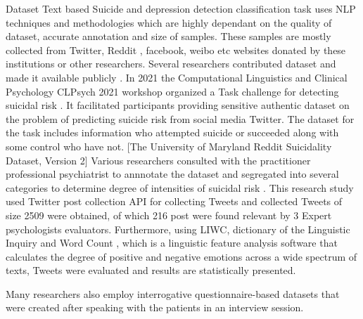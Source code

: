 \documentclass[12pt, letterpaper]{article}
\begin{document}
Dataset
Text based Suicide and depression detection classification task uses NLP techniques and methodologies which are highly dependant on the quality of dataset, accurate annotation and size of samples. These samples are mostly collected from Twitter, Reddit \cite{tadesse2019detection}, facebook, weibo etc websites donated by these institutions or other researchers. Several researchers contributed dataset and made it available publicly \cite{rissola2020dataset}. In 2021 the Computational Linguistics and Clinical Psychology CLPsych 2021 workshop organized a Task challenge for detecting suicidal risk \cite{macavaney2021community}. It facilitated participants providing sensitive authentic dataset on the problem of predicting suicide risk from social media Twitter. The dataset for the task includes information who attempted suicide or succeeded along with some control who have not. [The University of Maryland Reddit Suicidality Dataset, Version 2]\cite{shing2018expert} Various researchers consulted with the practitioner professional psychiatrist to annnotate the dataset and segregated into several categories to determine degree of intensities of suicidal risk \cite{gaur2019knowledge}. \cite{lopez2022exploring} This research study used Twitter post collection API for collecting Tweets and collected Tweets of size 2509 were obtained, of which 216 post were found relevant by 3 Expert psychologists evaluators. Furthermore, using LIWC, dictionary of the Linguistic Inquiry and Word Count \cite{pennebaker2001linguistic}, which is a linguistic feature analysis software that calculates the degree of positive and negative emotions across a wide spectrum of texts, Tweets were evaluated and results are statistically presented. 

Many researchers also employ interrogative questionnaire-based datasets that were created after speaking with the patients in an interview session. 
\end{document}
